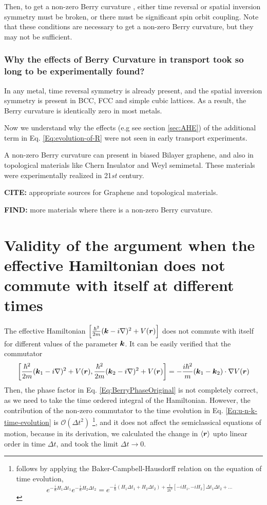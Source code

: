 \documentclass{report}
\renewcommand\vec[1]{\ensuremath\boldsymbol{#1}} %
\begin{document}
Then, to get a non-zero Berry curvature \cite{ralph2020berry}, either time reversal or spatial inversion symmetry must be broken, or there must be significant spin orbit coupling. Note that these conditions are necessary to get a non-zero Berry curvature, but they may not be sufficient.

\subsection{Why the effects of Berry Curvature in transport took so long to be experimentally found?}
 In any metal, time reversal symmetry is already present, and the spatial inversion symmetry is present in BCC, FCC and simple cubic lattices. As a result, the Berry curvature is identically zero in most metals.
 
 Now we understand why the effects (e.g see section \ref{sec:AHE}) of the additional term in Eq. \eqref{Eq:evolution-of-R} were not seen in early transport experiments.
 
 A non-zero Berry curvature can present in biased Bilayer graphene, and also in topological materials like Chern Insulator and Weyl semimetal. These materials were experimentally realized in 21\textit{st} century.
 
 \textbf{CITE:} appropriate sources for Graphene and topological materials.
 
 \textbf{FIND:} more materials where there is a non-zero Berry curvature.
\chapter{Validity of the argument when the effective Hamiltonian does not commute with itself at different times}
The effective Hamiltonian $\left[\frac{\hbar^2}{2m}(\vec{k} - i \nabla)^2 + V(\vec{r}) \right]$ does not commute with itself for different values of the parameter $\vec{k}$. It can be easily verified that the commutator
$$
\left[\frac{\hbar^2}{2m}(\vec{k}_1 - i \nabla)^2 + V(\vec{r}), \frac{\hbar^2}{2m}(\vec{k}_2 - i \nabla)^2 + V(\vec{r}) \right] = -\frac{i \hbar^2}{m} (\vec{k}_1 - \vec{k}_2)\cdot\nabla V(\vec{r})
$$
 Then, the phase factor in Eq. \eqref{Eq:BerryPhaseOriginal} is not completely correct, as we need to take the time ordered integral of the Hamiltonian. However, the contribution of the non-zero commutator to the time evolution in Eq. \eqref{Eq:u-n-k-time-evolution} is $\mathcal{O} \left(\Delta{t}^2\right)$ \footnote{follows by applying the Baker-Campbell-Hausdorff relation on the equation of time evolution, $$e^{-\frac{i}{\hbar} H_1 \Delta t_1} e^{-\frac{i}{\hbar} H_2 \Delta t_2} = e^{-\frac{i}{\hbar} \left(H_1 \Delta t_1 + H_2 \Delta t_2\right) + \frac{1}{2 \hbar^2} \left[-i H_1, -i H_2\right]\Delta t_1 \Delta t_2 + \dots}$$}, and it does not affect the semiclassical equations of motion, because in its derivation, we calculated the change in $\expval{\vec{r}}$ upto linear order in time $\Delta t$, and took the limit $\Delta t \rightarrow 0$.
\end{document}
